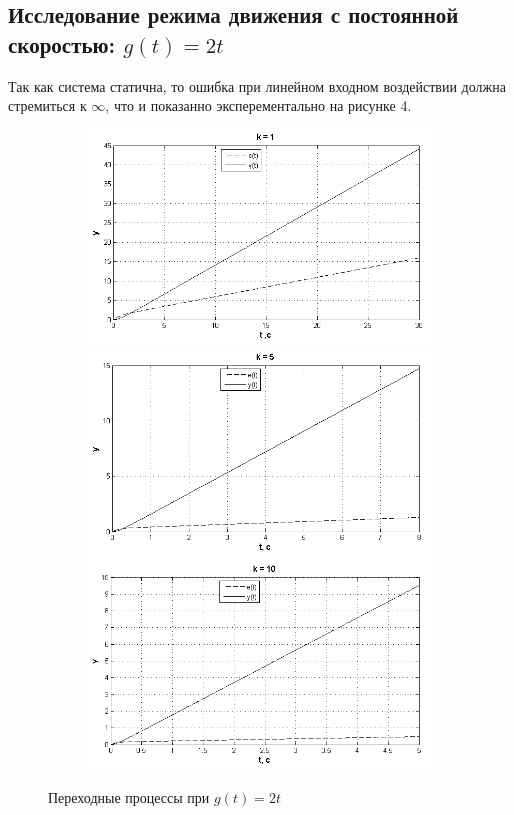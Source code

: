 \documentclass[a4paper, 11pt, russian]{article}
\begin{document}
    \subsection{Исследование режима движения с постоянной скоростью: $g(t) = 2t$}
    Так как система статична, то ошибка при линейном входном воздействии должна стремиться к $\infty$, что и показанно эксперементально на рисунке 4.
    
    \begin{figure}[h!]
        \centering
        \begin{subfigure}{0.7\textwidth}
            \includegraphics[width = \textwidth]{vInput0ast1k.png}
            \includegraphics[width = \textwidth]{vInput0ast5k.png}
            \includegraphics[width = \textwidth]{vInput0ast10k.png}
        \end{subfigure}
        \caption{Переходные процессы при $g(t) = 2t$}
    \end{figure}
\end{document}
